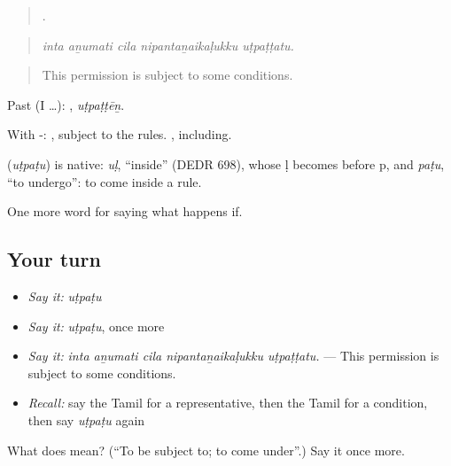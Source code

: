 \begin{quote}
    .
\end{quote}

\begin{quote}
\emph{inta aṉumati cila nipantaṉaikaḷukku uṭpaṭṭatu.}
\end{quote}

\begin{quote}
This permission is subject to some conditions.
\end{quote}

Past (I …): , \emph{uṭpaṭṭēṉ}.

With -:  , subject to the rules. , including.

\begin{cousinweb}
\textbf{} (\emph{uṭpaṭu}) is native: \emph{uḷ}, \textquotedblleft{}inside\textquotedblright{} (DEDR 698), whose ḷ becomes  before p, and \emph{paṭu}, \textquotedblleft{}to undergo\textquotedblright{}: to come inside a rule.
\end{cousinweb}

\begin{grammarlens}[title={What you've built}]
One more word for saying what happens if.
\end{grammarlens}

\subsection*{Your turn}
\begin{itemize}
\raggedright
  \item \emph{Say it:} \emph{uṭpaṭu}
  \item \emph{Say it:} \emph{uṭpaṭu}, once more
  \item \emph{Say it:} \emph{inta aṉumati cila nipantaṉaikaḷukku uṭpaṭṭatu.} — This permission is subject to some conditions.
  \item \emph{Recall:} say the Tamil for a representative, then the Tamil for a condition, then say \emph{uṭpaṭu} again
\end{itemize}

\begin{tcolorbox}[breakable,colback=teal!4,colframe=teal!35!black,title={Before you move on}]
What does  mean? (\textquotedblleft{}To be subject to; to come under\textquotedblright{}.) Say it once more.
\end{tcolorbox}
